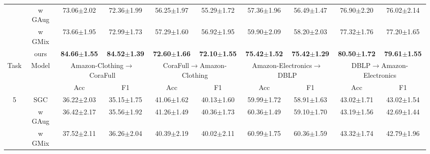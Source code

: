 \begin{table*}[ht]
{\begin{tabular}{@{}c|c|cccccccc@{}}
                      & w GAug                 & 73.06$\pm$2.02                   & 72.36$\pm$1.99                  & 56.25$\pm$1.97                   & 55.29$\pm$1.72                  & 57.36$\pm$1.96                  & 56.49$\pm$1.47                  & 76.90$\pm$2.20                  & 76.02$\pm$2.14                  \\
                      & w GMix                 & 73.66$\pm$1.95                   & 72.99$\pm$1.73                  & 57.29$\pm$1.60                   & 56.92$\pm$1.95                  & 59.90$\pm$2.09                  & 58.20$\pm$2.03                  & 77.32$\pm$1.76                  & 77.20$\pm$1.65                  \\
                      & ours                   & \textbf{84.66$\pm$1.55}          & \textbf{84.52$\pm$1.39}         & \textbf{72.60$\pm$1.66}          & \textbf{72.10$\pm$1.55}         & \textbf{75.42$\pm$1.52}         & \textbf{75.42$\pm$1.29}         & \textbf{80.50$\pm$1.72}         & \textbf{79.61$\pm$1.55}         \\ \midrule
\multirow{2}{*}{Task} & \multirow{2}{*}{Model} & \multicolumn{2}{c}{Amazon-Clothing$\rightarrow$CoraFull} & \multicolumn{2}{c}{CoraFull$\rightarrow$Amazon-Clothing} & \multicolumn{2}{c}{Amazon-Electronics$\rightarrow$DBLP} & \multicolumn{2}{c}{DBLP$\rightarrow$Amazon-Electronics} \\ \cmidrule(l){3-10} 
                      &                        & Acc                          & F1                          & Acc                          & F1                          & Acc                         & F1                          & Acc                         & F1                          \\ \midrule
\multirow{4}{*}{5}    & SGC                    & 36.22$\pm$2.03                   & 35.15$\pm$1.75                  & 41.06$\pm$1.62                   & 40.13$\pm$1.60                  & 59.99$\pm$1.72                  & 58.91$\pm$1.63                  & 43.02$\pm$1.71                  & 43.02$\pm$1.54                  \\
                      & w GAug                 & 36.42$\pm$2.17                   & 35.56$\pm$1.92                  & 41.26$\pm$1.49                   & 40.36$\pm$1.73                  & 60.36$\pm$1.49                  & 59.10$\pm$1.70                  & 43.19$\pm$1.56                  & 42.69$\pm$1.44                  \\
                      & w GMix                 & 37.52$\pm$2.11                   & 36.26$\pm$2.04                  & 40.39$\pm$2.19                   & 40.02$\pm$2.11                  & 60.99$\pm$1.75                  & 60.36$\pm$1.59                  & 43.32$\pm$1.74                  & 42.79$\pm$1.96                  \\

\end{tabular}}
\end{table*}
